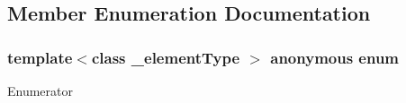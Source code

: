 \subsection{Member Enumeration Documentation}
\hypertarget{classvct_quaternion_afa19be877555ceeedba0f4e910b22e51}{\subsubsection[{anonymous enum}]{\setlength{\rightskip}{0pt plus 5cm}template$<$class \-\_\-element\-Type $>$ anonymous enum}}\label{classvct_quaternion_afa19be877555ceeedba0f4e910b22e51}
\begin{Desc}
\item[Enumerator]\par
\begin{description}
\item[{\em 
\hypertarget{classvct_quaternion_afa19be877555ceeedba0f4e910b22e51a12aabd231905465cec7ef73c8b4c043f}{S\-I\-Z\-E}\label{classvct_quaternion_afa19be877555ceeedba0f4e910b22e51a12aabd231905465cec7ef73c8b4c043f}
}]\end{description}
\end{Desc}


